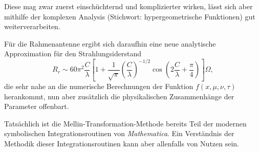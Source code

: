 Diese mag zwar zuerst einschüchternd und komplizierter wirken, lässt 
sich aber mithilfe der komplexen Analysis 
(Stichwort: hypergeometrische Funktionen) gut weiterverarbeiten.

Für die Rahmenantenne ergibt sich daraufhin eine neue analytische 
Approximation für den Strahlungsiderstand 
\[
    R_r \sim 60\pi^2 \frac{C}{\lambda}
    \left[1+\frac{1}{\sqrt{\pi}}\left(\frac{C}{\lambda}\right)^{-1/2} 
    \cos\left(2\frac{C}{\lambda}+\frac{\pi}{4}\right)\right] \Omega
    ,
\]
die sehr nahe an die numerische Berechnungen der Funktion $f(x, \mu, \nu, \tau)$ 
herankommt, nun aber zusätzlich die physikalischen Zusammenhänge der 
Parameter offenbart.
\medskip

Tatsächlich ist die Mellin-Transformation-Methode bereits Teil der  
modernen symbolischen Integrationsroutinen von {\em Mathematica}.
Ein Verständnis der Methodik dieser Integrationsroutinen kann aber
allenfalls von Nutzen sein.